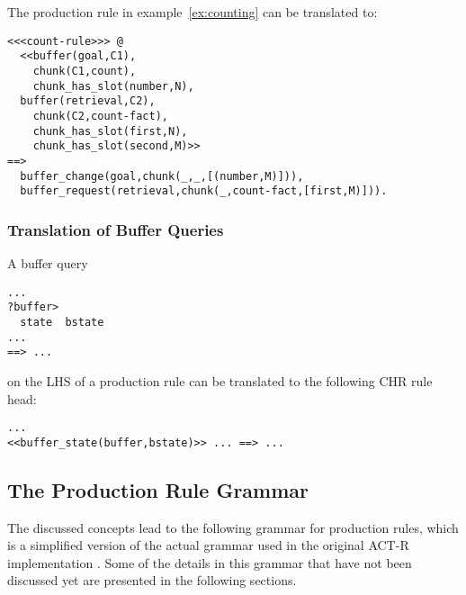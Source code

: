 \begin{example}
The production rule in example~\ref{ex:counting} can be translated to:

\begin{lstlisting}
<<<count-rule>>> @
  <<buffer(goal,C1), 
    chunk(C1,count),
    chunk_has_slot(number,N),
  buffer(retrieval,C2),
    chunk(C2,count-fact),
    chunk_has_slot(first,N),
    chunk_has_slot(second,M)>>
==>
  buffer_change(goal,chunk(_,_,[(number,M)])),
  buffer_request(retrieval,chunk(_,count-fact,[first,M)])).
\end{lstlisting}

\end{example}


\subsubsection{Translation of Buffer Queries}

A buffer query

\begin{lstlisting}
...
?buffer>
  state  bstate 
...
==> ...
\end{lstlisting}

on the LHS of a production rule can be translated to the following CHR rule head:

\begin{lstlisting}
...
<<buffer_state(buffer,bstate)>> ... ==> ...
\end{lstlisting}

\subsection{The Production Rule Grammar}
\label{implementation:production_rule_grammar}

The discussed concepts lead to the following grammar for production rules, which is a simplified version of the actual grammar used in the original ACT-R implementation \cite[p. 162]{actr_reference}. Some of the details in this grammar that have not been discussed yet are presented in the following sections.


